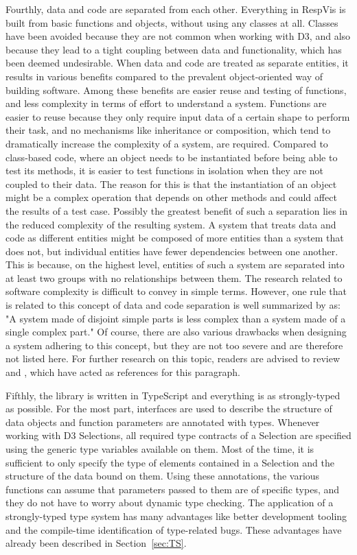 Fourthly, data and code are separated from each other.
Everything in RespVis is built from basic functions and objects, without using any classes at all. 
Classes have been avoided because they are not common when working with D3, and also because they lead to a tight coupling between data and functionality, which has been deemed undesirable.
When data and code are treated as separate entities, it results in various benefits compared to the prevalent object-oriented way of building software.
Among these benefits are easier reuse and testing of functions, and less complexity in terms of effort to understand a system. 
Functions are easier to reuse because they only require input data of a certain shape to perform their task, and no mechanisms like inheritance or composition, which tend to dramatically increase the complexity of a system, are required.
Compared to class-based code, where an object needs to be instantiated before being able to test its methods, it is easier to test functions in isolation when they are not coupled to their data. 
The reason for this is that the instantiation of an object might be a complex operation that depends on other methods and could affect the results of a test case. 
Possibly the greatest benefit of such a separation lies in the reduced complexity of the resulting system.
A system that treats data and code as different entities might be composed of more entities than a system that does not, but individual entities have fewer dependencies between one another.
This is because, on the highest level, entities of such a system are separated into at least two groups with no relationships between them.
The research related to software complexity is difficult to convey in simple terms.
However, one rule that is related to this concept of data and code separation is well summarized by  as: "A system made of disjoint simple parts is less complex than a system made of a single complex part."
Of course, there are also various drawbacks when designing a system adhering to this concept, but they are not too severe and are therefore not listed here.
For further research on this topic, readers are advised to review  and , which have acted as references for this paragraph.

Fifthly, the library is written in TypeScript and everything is as strongly-typed as possible.
For the most part, interfaces are used to describe the structure of data objects and function parameters are annotated with types.
Whenever working with D3 Selections, all required type contracts of a Selection are specified using the generic type variables available on them.
Most of the time, it is sufficient to only specify the type of elements contained in a Selection and the structure of the data bound on them.
Using these annotations, the various functions can assume that parameters passed to them are of specific types, and they do not have to worry about dynamic type checking.
The application of a strongly-typed type system has many advantages like better development tooling and the compile-time identification of type-related bugs.
These advantages have already been described in Section~\ref{sec:TS}.

